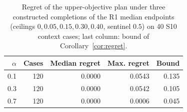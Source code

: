 \begin{table}[tb]
\centering
\caption{Regret of the upper-objective plan under three constructed completions of the R1 median endpoints (ceilings $0,0.05,0.15,0.30,0.40$, sentinel $0.5$) on 40 S10 context cases; last column: bound of Corollary~\ref{cor:regret}.}
\label{tab:endpoint-v10}
\scriptsize\setlength{\tabcolsep}{3pt}
\begin{tabular}{@{}rrrrr@{}}
\toprule
$\alpha$ & Cases & Median regret & Max. regret & Bound\\\midrule
0.1 & 120 & 0.0000 & 0.0543 & 0.135\\
0.3 & 120 & 0.0000 & 0.0542 & 0.105\\
0.7 & 120 & 0.0000 & 0.0006 & 0.045\\
\bottomrule
\end{tabular}
\end{table}
